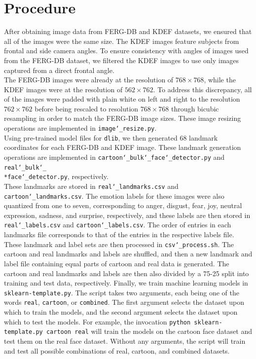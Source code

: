 \documentclass{Project}
\begin{document}
\section{Procedure}
After obtaining image data from FERG-DB and KDEF datasets, we ensured that all
of the images were the same size. The KDEF images feature subjects from frontal
and side camera angles. To ensure consistency with angles of images used from
the FERG-DB dataset, we filtered the KDEF images to use only images captured
from a direct frontal angle. \\

The FERG-DB images were already at the resolution of $768 \times 768$, 
while the KDEF images were at the resolution of $562 \times 762$.
To address this discrepancy, all of the images were padded
with plain white on left and right to the resolution $762 \times 762$ before
being rescaled to resolution $768 \times 768$ through bicubic resampling in
order to match the FERG-DB image sizes. These image resizing operations are
implemented in \texttt{image\char`_resize.py}. \\

Using pre-trained model files for \texttt{dlib}, we then generated 68 landmark
coordinates for each FERG-DB and KDEF image.\cite{dlib-models}\cite{dlib09}
These landmark generation operations are implemented in 
\texttt{cartoon\char`_bulk\char`_face\char`_detector.py}
and \texttt{real\char`_bulk\char`_\\*face\char`_detector.py}, respectively. \\

These landmarks are stored in \texttt{real\char`_landmarks.csv}
and \texttt{cartoon\char`_landmarks.csv}. The emotion labels for these images
were also quantized from one to seven, corresponding to anger, disgust, fear,
joy, neutral expression, sadness, and surprise, respectively, and these labels
are then stored in \texttt{real\char`_labels.csv}
and \texttt{cartoon\char`_labels.csv}. The order of entries in each landmarks
file corresponds to that of the entries in the respective labels file. \\

These landmark and label sets are then processed in
\texttt{csv\char`_pro\-cess.sh}. The cartoon and real landmarks and labels are
shuffled, and then a new landmark and label file containing equal parts of
cartoon and real data is generated. The cartoon and real landmarks and labels
are then also divided by a 75-25 split into training and test data,
respectively. Finally, we train machine learning models in
\texttt{sklearn-templ\-ate.py}. The script takes two arguments, each being one of
the words \texttt{real}, \texttt{cartoon}, or \texttt{combined}. The first
argument selects the dataset upon which to train the models, and the second
argument selects the dataset upon which to test the models. For example, the
invocation \texttt{python sklearn-template.py cartoon real} will train the
models on the cartoon face dataset and test them on the real face dataset.
Without any arguments, the script will train and test all possible combinations
of real, cartoon, and combined datasets. \\
\end{document}
